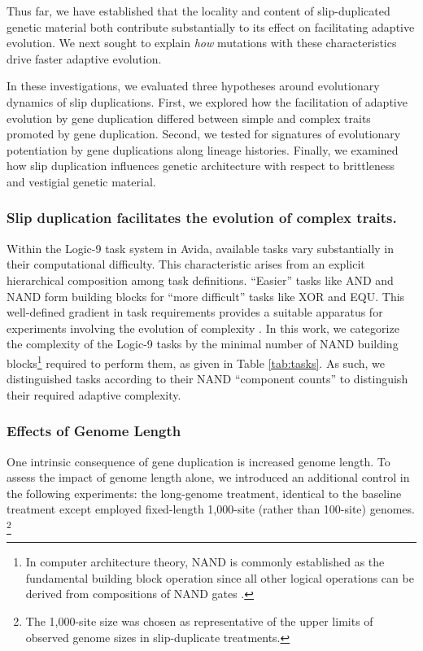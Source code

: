 Thus far, we have established that the locality and content of slip-duplicated genetic material both contribute substantially to its effect on facilitating adaptive evolution.
We next sought to explain \textit{how} mutations with these characteristics drive faster adaptive evolution.

In these investigations, we evaluated three hypotheses around evolutionary dynamics of slip duplications.
First, we explored how the facilitation of adaptive evolution by gene duplication differed between simple and complex traits promoted by gene duplication.
Second, we tested for signatures of evolutionary potentiation by gene duplications along lineage histories.
Finally, we examined how slip duplication influences genetic architecture with respect to brittleness and vestigial genetic material.

\subsubsection{Slip duplication facilitates the evolution of complex traits.}

Within the Logic-9 task system in Avida, available tasks vary substantially in their computational difficulty.
This characteristic arises from an explicit hierarchical composition among task definitions.
``Easier'' tasks like AND and NAND form building blocks for ``more difficult'' tasks like XOR and EQU.
This well-defined gradient in task requirements provides a suitable apparatus for experiments involving the evolution of complexity \citep{lenski2003evolutionary}.
In this work, we categorize the complexity of the Logic-9 tasks by the minimal number of NAND building blocks\footnote{
In computer architecture theory, NAND is commonly established as the fundamental building block operation since all other logical operations can be derived from compositions of NAND gates \citep{mano1997logic}.
} required to perform them, as given in Table \ref{tab:tasks}.
As such, we distinguished tasks according to their NAND ``component counts'' to distinguish their required adaptive complexity.

\subsubsection{Effects of Genome Length}



One intrinsic consequence of gene duplication is increased genome length.
To assess the impact of genome length alone, we introduced an additional control in the following experiments: the long-genome treatment, identical to the baseline treatment except employed fixed-length 1,000-site (rather than 100-site) genomes.%
\footnote{%
The 1,000-site size was chosen as representative of the upper limits of observed genome sizes in slip-duplicate treatments.
}


